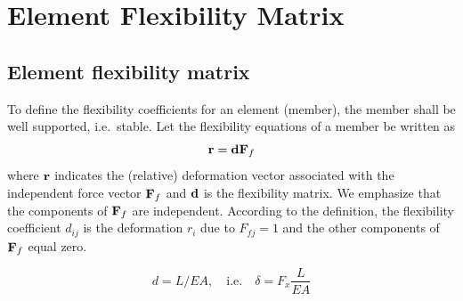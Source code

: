 \chapter{Element Flexibility Matrix}
\label{ch:flex}

\section{Element flexibility matrix}
To define the flexibility coefficients for an element (member), the member shall be well supported, i.e.\ stable. Let the flexibility equations of a member be written as
\begin{equation}
  \mathbf{r} = \mathbf{d}\mathbf{F}_f
\end{equation}
where $\mathbf{r}$ indicates the (relative) deformation vector associated with the independent force vector $\mathbf{F}_f$ and $\mathbf{d}$ is the flexibility matrix. We emphasize that the components of $\mathbf{F}_f$ are independent. According to the definition, the flexibility coefficient $d_{ij}$ is the deformation $r_i$ due to $F_{fj} = 1$ and the other components of $\mathbf{F}_f$ equal zero.

\begin{equation}
  d = L/EA,\quad\text{i.e.}\quad \delta = F_x\frac{L}{EA}
\end{equation}

